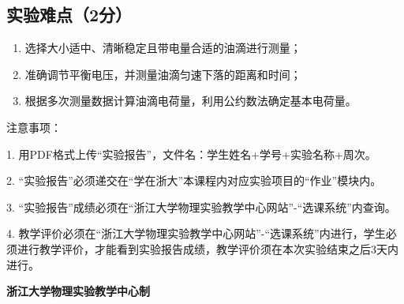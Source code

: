 \documentclass[10pt,a4paper]{ctexart} %
\begin{document}
  \subsection{实验难点（2分）}
  \begin{enumerate}
    \item 选择大小适中、清晰稳定且带电量合适的油滴进行测量；
    \item 准确调节平衡电压，并测量油滴匀速下落的距离和时间；
    \item 根据多次测量数据计算油滴电荷量，利用公约数法确定基本电荷量。
  \end{enumerate}

\vspace*{\fill} %
\noindent
\begin{minipage}{\textwidth}
  注意事项：

  \begingroup
    \setlength{\leftskip}{2em} %
    1. 用PDF格式上传“实验报告”，文件名：学生姓名+学号+实验名称+周次。

    2. “实验报告”必须递交在“学在浙大”本课程内对应实验项目的“作业”模块内。

    3. “实验报告”成绩必须在“浙江大学物理实验教学中心网站”-“选课系统”内查询。

    4. 教学评价必须在“浙江大学物理实验教学中心网站”-“选课系统”内进行，学生必须进行教学评价，才能看到实验报告成绩，教学评价须在本次实验结束之后3天内进行。\par
  \endgroup

  \begin{center}
    {\bfseries 浙江大学物理实验教学中心制}
  \end{center}
\end{minipage}
\end{document}
